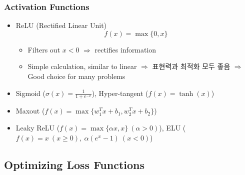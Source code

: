 \subsubsection*{Activation Functions}
\begin{itemize}
    \item ReLU (Rectified Linear Unit)
    \begin{equation}
        f(x)=\max\{0,x\}
    \end{equation}
    \begin{itemize}
        \item Filters out $x<0$ $\Rightarrow$ rectifies information
        \item Simple calculation, similar to linear $\Rightarrow$ 표현력과 최적화 모두 좋음 $\Rightarrow$ Good choice for many problems
    \end{itemize}
    \item Sigmoid ($\sigma(x)=\frac{1}{1+e^{-x}}$), Hyper-tangent ($f(x)=\tanh(x)$)
    \item Maxout ($f(x)=\max\{w_1^Tx+b_1,w_2^Tx+b_2\}$)
    \item Leaky ReLU ($f(x)=\max\{\alpha x,x\}~(\alpha>0)$), ELU ($f(x)=x~(x\geq 0),~\alpha(e^x-1)~(x<0)$)
\end{itemize}
\begin{figures}
\end{figures}

\subsection{Optimizing Loss Functions}

